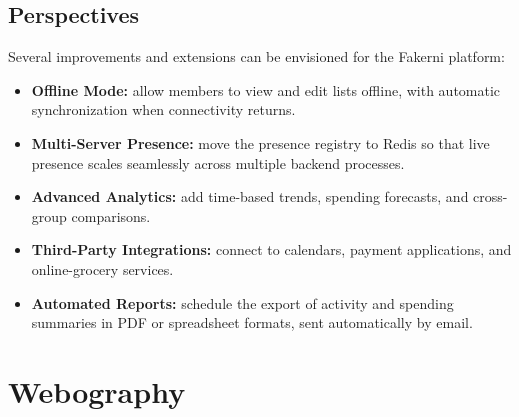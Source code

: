 \documentclass[12pt,a4paper,oneside]{report}
\begin{document}
\section*{Perspectives}
Several improvements and extensions can be envisioned for the Fakerni platform:
\begin{itemize}[nosep]
  \item \textbf{Offline Mode:} allow members to view and edit lists offline, with
        automatic synchronization when connectivity returns.
  \item \textbf{Multi-Server Presence:} move the presence registry to Redis so that
        live presence scales seamlessly across multiple backend processes.
  \item \textbf{Advanced Analytics:} add time-based trends, spending forecasts, and
        cross-group comparisons.
  \item \textbf{Third-Party Integrations:} connect to calendars, payment
        applications, and online-grocery services.
  \item \textbf{Automated Reports:} schedule the export of activity and spending
        summaries in PDF or spreadsheet formats, sent automatically by email.
\end{itemize}

\chapter*{Webography}
\end{document}
